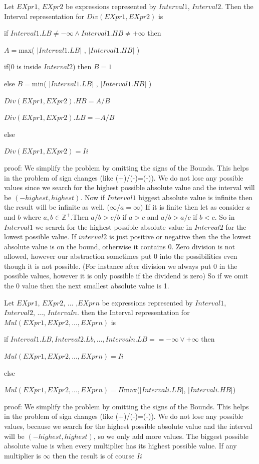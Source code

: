 \begin{theorem}
	Let $EXpr1$, $EXpr2$ be expressions represented by $Interval1$, $Interval2$. Then the Interval representation for $Div(EXpr1, EXpr2)$ is 
	
	if $Interval1.LB \neq -\infty \land Interval1.HB \neq +\infty$ then 
	
		$A = $max( $|Interval1.LB|$ , $|Interval1.HB|$ )
	
		if($0$ is inside $Interval2$) then $B = 1$		
	
		else $B = $min( $|Interval1.LB|$ , $|Interval1.HB|$ )		
		
		$Div(EXpr1, EXpr2).HB = A/B$
		
		$Div(EXpr1, EXpr2).LB = -A/B$
		
	else
	
		$Div(EXpr1, EXpr2) = Ii$
	
\end{theorem}
{proof: } We simplify the problem by omitting the signs of the Bounds. This helps in the problem of sign changes (like (+)/(-)=(-)).  We do not lose any possible values since we search for the highest possible absolute value and the interval will be $(-highest, highest)$. Now if $Interval1$ biggest absolute value is infinite then the result will be infinite as well. ($\infty / a = \infty)$ If it is finite then let as consider $a$ and $b$ where $a, b \in \mathbb{Z}^{+}$.Then $a/b > c/b$ if $a>c$ and $a/b > a/c$ if $b<c$. So in $Interval1$ we search for the highest possible absolute value in $Interval2$ for the lowest possible value. If $interval2$ is just positive or negative then the the lowest absolute value is on the bound, otherwise it contains 0. Zero division is not allowed, however our abstraction sometimes put 0 into the possibilities even though it is not possible. (For instance after division we always put 0 in the possible values, however it is only possible if the dividend is zero) So if we omit the 0 value then the next smallest absolute value is 1.

\begin{theorem}
	Let $EXpr1$, $EXpr2$, ... ,$EXprn$ be expressions represented by $Interval1$, $Interval2$, ..., $Intervaln$. then the Interval representation for $Mul(EXpr1, EXpr2, ... ,EXprn)$ is
	
	if $Interval1.LB, Interval2.Lb, ... ,Intervaln.LB == -\infty \lor +\infty$ then 
	
	$Mul(EXpr1, EXpr2, ... ,EXprn)=Ii$
	
	else
	
	$Mul(EXpr1, EXpr2, ... ,EXprn)= \Pi $max($|Intervali.LB|$, $|Intervali.HB|$)
\end{theorem}
{proof: } We simplify the problem by omitting the signs of the Bounds. This helps in the problem of sign changes (like (+)/(-)=(-)).  We do not lose any possible values, because we search for the highest possible absolute value and the interval will be $(-highest, highest)$, so we only add more values. The biggest possible absolute value is when every multiplier has its highest possible value. If any multiplier is $\infty$ then the result is of course $Ii$


